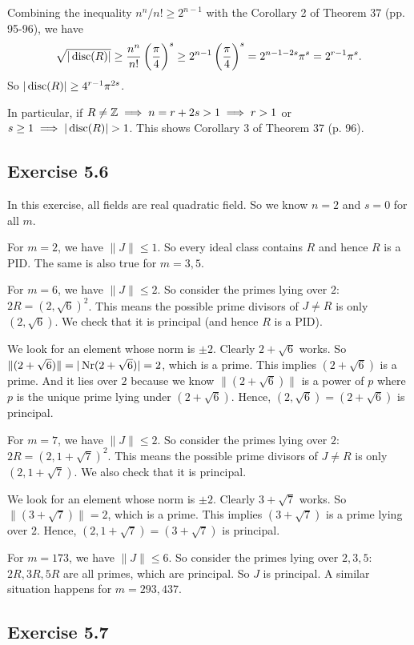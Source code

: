\documentclass[../Marcus.tex]{subfiles}
\begin{document}
Combining the inequality $n^n/n! \geq 2^{n-1}$ with the Corollary 2 of Theorem 37 (pp. 95-96), we have
$$
\sqrt{|\operatorname{disc}(R)|}
\geq \frac{n^n}{n!} \left(\frac{\pi}{4}\right)^s
\geq 2^{n-1} \left(\frac{\pi}{4}\right)^s
= 2^{n-1-2s} \pi^s
= 2^{r-1} \pi^s.
$$
So $|\operatorname{disc}(R)| \geq 4^{r-1}\pi^{2s}$.

In particular, if $R\neq\mathbb{Z} \implies n=r+2s>1 \implies r>1$ or $s\geq 1 \implies |\operatorname{disc}(R)| >1$. This shows Corollary 3 of Theorem 37 (p. 96).

\subsection*{Exercise 5.6}

In this exercise, all fields are real quadratic field. So we know $n=2$ and $s=0$ for all $m$.

For $m=2$, we have $\|J\| \leq 1$. So every ideal class contains $R$ and hence $R$ is a PID. The same is also true for $m=3,5$.

For $m=6$, we have $\|J\| \leq 2$. So consider the primes lying over $2$: $2R=(2,\sqrt{6})^2$. This means the possible prime divisors of $J\neq R$ is only $(2,\sqrt{6})$. We check that it is principal (and hence $R$ is a PID).

We look for an element whose norm is $\pm2$. Clearly $2+\sqrt{6}$ works. So $\|(2+\sqrt{6})\| = |\operatorname{Nr}(2+\sqrt{6})| = 2$, which is a prime. This implies $(2+\sqrt{6})$ is a prime. And it lies over $2$ because we know $\|(2+\sqrt{6})\|$ is a power of $p$ where $p$ is the unique prime lying under $(2+\sqrt{6})$. Hence, $(2,\sqrt{6}) = (2+\sqrt{6})$ is principal.

For $m=7$, we have $\|J\| \leq 2$. So consider the primes lying over $2$: $2R=(2,1+\sqrt{7})^2$. This means the possible prime divisors of $J\neq R$ is only $(2,1+\sqrt{7})$. We also check that it is principal.

We look for an element whose norm is $\pm2$. Clearly $3+\sqrt{7}$ works. So $\|(3+\sqrt{7})\| = 2$, which is a prime. This implies $(3+\sqrt{7})$ is a prime lying over $2$. Hence, $(2,1+\sqrt{7}) = (3+\sqrt{7})$ is principal.

For $m=173$, we have $\|J\| \leq 6$. So consider the primes lying over $2,3,5$: $2R,3R,5R$ are all primes, which are principal. So $J$ is principal. A similar situation happens for $m=293,437$.

\subsection*{Exercise 5.7}
\end{document}
